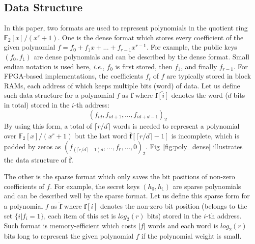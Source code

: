\documentclass[runningheads]{llncs}
\begin{document}
\subsection{Data Structure}
In this paper, two formats are used to represent polynomials in the quotient ring $\mathbb{F}_2[x]/(x^r+1)$. One is the dense format which stores every coefficient of the given polynomial $f=f_0+f_1x+\ldots +f_{r-1}x^{r-1}$. For example, the public keys $(f_0, f_1)$ are dense polynomials and can be described by the dense format. Small endian notation is used here, \textit{i.e.}, $f_0$ is first stored, then $f_1$, and finally $f_{r-1}$.
For FPGA-based implementations, the coefficients $f_i$ of $f$ are typically stored in block RAMs, each address of which keeps multiple bits (word) of data. Let us define such data structure for a polynomial $f$ as $\overline{\mathbf{f}}$ where $\overline{\mathbf{f}[i]}$ denotes the word ($d$ bits in total) stored in the $i$-th address:
\[
(f_{id},f_{id+1},\ldots,f_{id+d-1})_2
\]
By using this form, a total of $\lceil r/d \rceil$ words is needed to represent a polynomial over $\mathbb{F}_2[x]/(x^r+1)$ but the last word  $\mathbf{\overline{f}}[\lceil r/d \rceil-1]$ is incomplete, which is padded by zeros as $(f_{(\lceil r/d\rceil-1)d},\ldots, f_{r},\ldots,0)_2$. Fig~\ref{fig:poly_dense} illustrates the data structure of $\overline{\mathbf{f}}$.

The other is the sparse format which only saves the bit positions of non-zero coefficients of $f$. For example, the secret keys $(h_0, h_1)$ are sparse polynomials and can be described well by the sparse format. Let us define this sparse form for a polynomial $f$ as $\mathbf{\hat{f}}$ where
$\hat{\mathbf{f}[i]}$ denotes the non-zero bit position (belongs to the set $\{i|f_i=1\}$, each item of this set is $log_2(r)$ bits) stored in the $i$-th address.
Such format is memory-efficient which costs $|f|$ words and each word is $log_2(r)$ bits long to represent the given polynomial $f$ if the polynomial weight is small.
\end{document}
